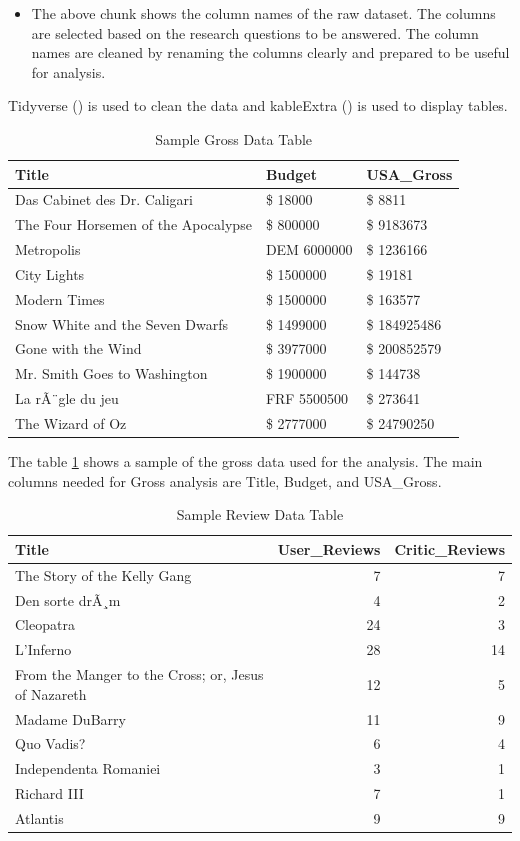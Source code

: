 \documentclass[11pt,a4paper,]{article}
\providecommand{\tightlist}{%
  \setlength{\itemsep}{0pt}\setlength{\parskip}{0pt}}
\begin{document}
\begin{itemize}
\tightlist
\item
  The above chunk shows the column names of the raw dataset. The columns are selected based on the research questions to be answered. The column names are cleaned by renaming the columns clearly and prepared to be useful for analysis.
\end{itemize}

Tidyverse (\textcite{tidyverse}) is used to clean the data and kableExtra (\textcite{kable}) is used to display tables.

\begin{table}

\caption{\label{tab:GrossTable}Sample Gross Data Table}
\centering
\begin{tabular}[t]{lll}
\toprule
Title & Budget & USA\_Gross\\
\midrule
Das Cabinet des Dr. Caligari & \$ 18000 & \$ 8811\\
The Four Horsemen of the Apocalypse & \$ 800000 & \$ 9183673\\
Metropolis & DEM 6000000 & \$ 1236166\\
City Lights & \$ 1500000 & \$ 19181\\
Modern Times & \$ 1500000 & \$ 163577\\
\addlinespace
Snow White and the Seven Dwarfs & \$ 1499000 & \$ 184925486\\
Gone with the Wind & \$ 3977000 & \$ 200852579\\
Mr. Smith Goes to Washington & \$ 1900000 & \$ 144738\\
La rÃ¨gle du jeu & FRF 5500500 & \$ 273641\\
The Wizard of Oz & \$ 2777000 & \$ 24790250\\
\bottomrule
\end{tabular}
\end{table}

The table \ref{tab:GrossTable} shows a sample of the gross data used for the analysis. The main columns needed for Gross analysis are Title, Budget, and USA\_Gross.

\begin{table}

\caption{\label{tab:ReviewTable}Sample Review Data Table}
\centering
\begin{tabular}[t]{lrr}
\toprule
Title & User\_Reviews & Critic\_Reviews\\
\midrule
The Story of the Kelly Gang & 7 & 7\\
Den sorte drÃ¸m & 4 & 2\\
Cleopatra & 24 & 3\\
L'Inferno & 28 & 14\\
From the Manger to the Cross; or, Jesus of Nazareth & 12 & 5\\
\addlinespace
Madame DuBarry & 11 & 9\\
Quo Vadis? & 6 & 4\\
Independenta Romaniei & 3 & 1\\
Richard III & 7 & 1\\
Atlantis & 9 & 9\\
\bottomrule
\end{tabular}
\end{table}
\end{document}
